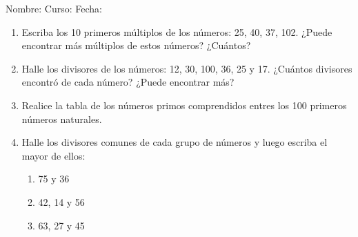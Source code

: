 \documentclass[letterpaper,fleqn]{article}
\newcommand{\LineaNombre}{%
\par
\vspace{\baselineskip}
Nombre:\hrulefill \; Curso: \underline{\hspace*{48pt}} \; Fecha: \underline{\hspace*{2.5cm}} \relax
\par}
\begin{document}
\LineaNombre
\begin{enumerate}
 \item Escriba los 10 primeros múltiplos de los números: 25, 40, 37, 102. ¿Puede encontrar más múltiplos de estos números? ¿Cuántos?\noanswer
 \item Halle los divisores de los números: 12, 30, 100, 36, 25 y 17. ¿Cuántos divisores encontró de cada número? ¿Puede encontrar más?\noanswer
 \item Realice la tabla de los números primos comprendidos entres los 100 primeros números naturales.\noanswer
 \item Halle los divisores comunes de cada grupo de números y luego escriba el mayor de ellos:
 \begin{enumerate}
 \item 75 y 36 \noanswer
 \item 42, 14 y 56 \noanswer
 \item 63, 27 y 45\noanswer
 \end{enumerate}
 \end{enumerate}
\end{document}
